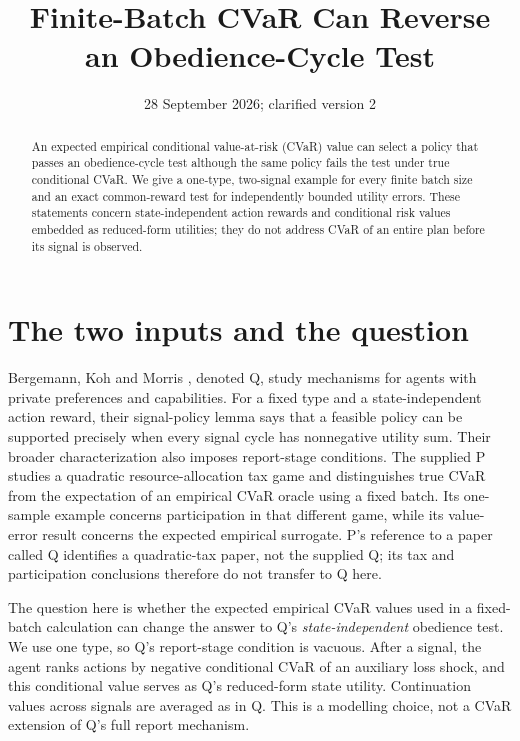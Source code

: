 \documentclass{article}
\title{Finite-Batch CVaR Can Reverse an Obedience-Cycle Test}
\date{28 September 2026; clarified version 2}
\begin{document}
\maketitle

\begin{abstract}
An expected empirical conditional value-at-risk (CVaR) value can select a policy that passes an obedience-cycle test although the same policy fails the test under true conditional CVaR. We give a one-type, two-signal example for every finite batch size and an exact common-reward test for independently bounded utility errors. These statements concern state-independent action rewards and conditional risk values embedded as reduced-form utilities; they do not address CVaR of an entire plan before its signal is observed. %
\end{abstract}

\section{The two inputs and the question}

Bergemann, Koh and Morris \cite{bergemann2026alignment}, denoted Q, study mechanisms for agents with private preferences and capabilities. For a fixed type and a state-independent action reward, their signal-policy lemma says that a feasible policy can be supported precisely when every signal cycle has nonnegative utility sum. Their broader characterization also imposes report-stage conditions. The supplied P \cite{pathfinder2026fixedbatch} studies a quadratic resource-allocation tax game and distinguishes true CVaR from the expectation of an empirical CVaR oracle using a fixed batch. Its one-sample example concerns participation in that different game, while its value-error result concerns the expected empirical surrogate. P's reference to a paper called Q identifies a quadratic-tax paper, not the supplied Q; its tax and participation conclusions therefore do not transfer to Q here. %

The question here is whether the expected empirical CVaR values used in a fixed-batch calculation can change the answer to Q's \emph{state-independent} obedience test. We use one type, so Q's report-stage condition is vacuous. After a signal, the agent ranks actions by negative conditional CVaR of an auxiliary loss shock, and this conditional value serves as Q's reduced-form state utility. Continuation values across signals are averaged as in Q. This is a modelling choice, not a CVaR extension of Q's full report mechanism. %
\end{document}

